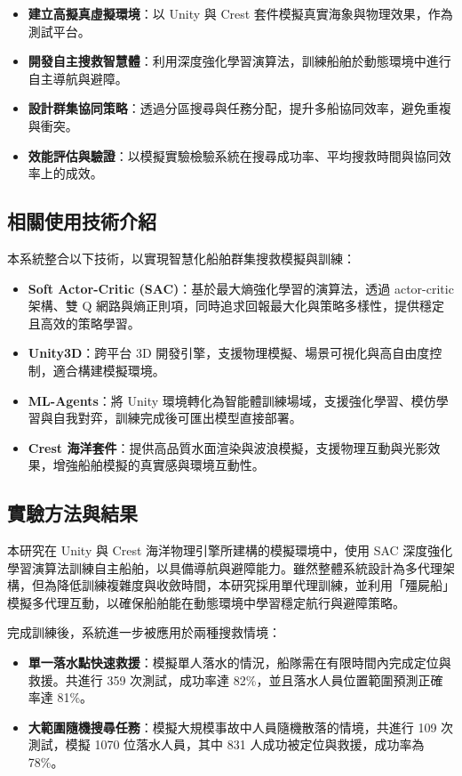 \documentclass[12pt,a4paper]{article}
\begin{document}
\begin{itemize}
\item \textbf{建立高擬真虛擬環境}：以 Unity 與 Crest 套件模擬真實海象與物理效果，作為測試平台。
\item \textbf{開發自主搜救智慧體}：利用深度強化學習演算法，訓練船舶於動態環境中進行自主導航與避障。
\item \textbf{設計群集協同策略}：透過分區搜尋與任務分配，提升多船協同效率，避免重複與衝突。
\item \textbf{效能評估與驗證}：以模擬實驗檢驗系統在搜尋成功率、平均搜救時間與協同效率上的成效。
\end{itemize}

\subsection{相關使用技術介紹}

本系統整合以下技術，以實現智慧化船舶群集搜救模擬與訓練：

\begin{itemize}
	\item \textbf{Soft Actor-Critic (SAC)}：基於最大熵強化學習的演算法，透過 actor-critic 架構、雙 Q 網路與熵正則項，同時追求回報最大化與策略多樣性，提供穩定且高效的策略學習。
	\item \textbf{Unity3D}：跨平台 3D 開發引擎，支援物理模擬、場景可視化與高自由度控制，適合構建模擬環境。
	\item \textbf{ML-Agents}：將 Unity 環境轉化為智能體訓練場域，支援強化學習、模仿學習與自我對弈，訓練完成後可匯出模型直接部署。
	 \item \textbf{Crest 海洋套件}：提供高品質水面渲染與波浪模擬，支援物理互動與光影效果，增強船舶模擬的真實感與環境互動性。
\end{itemize}

\subsection{實驗方法與結果}
本研究在 Unity 與 Crest 海洋物理引擎所建構的模擬環境中，使用 SAC 深度強化學習演算法訓練自主船舶，以具備導航與避障能力。雖然整體系統設計為多代理架構，但為降低訓練複雜度與收斂時間，本研究採用單代理訓練，並利用「殭屍船」模擬多代理互動，以確保船舶能在動態環境中學習穩定航行與避障策略。

完成訓練後，系統進一步被應用於兩種搜救情境：  
\begin{itemize}
    \item \textbf{單一落水點快速救援}：模擬單人落水的情況，船隊需在有限時間內完成定位與救援。共進行 359 次測試，成功率達 82\%，並且落水人員位置範圍預測正確率達 81\%。  
    \item \textbf{大範圍隨機搜尋任務}：模擬大規模事故中人員隨機散落的情境，共進行 109 次測試，模擬 1070 位落水人員，其中 831 人成功被定位與救援，成功率為 78\%。  
\end{itemize}
\end{document}
